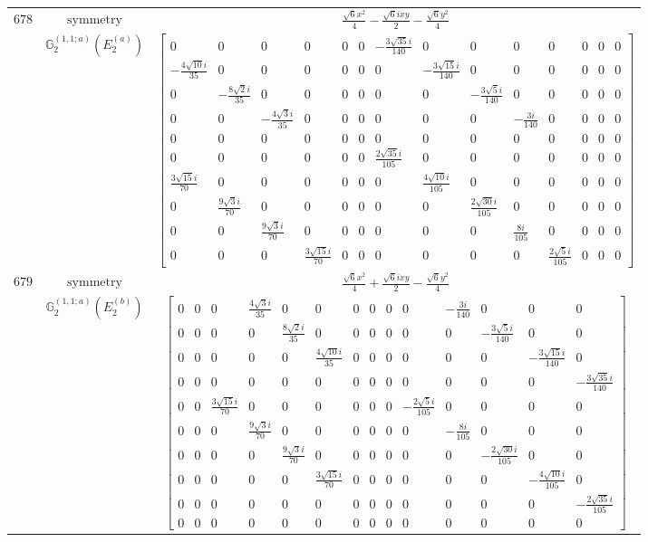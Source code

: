 \documentclass[fleqn,8pt,landscape]{jsarticle}
\begin{document}
\begin{longtable}{ccc}
$ 678 $ & $ \text{symmetry} $ & $ \frac{\sqrt{6} x^{2}}{4} - \frac{\sqrt{6} i x y}{2} - \frac{\sqrt{6} y^{2}}{4} $ \\
$  $ & $ \mathbb{G}_{2}^{(1,1;a)}(E_{2}^{(a)}) $ & $ \begin{bmatrix} 0 & 0 & 0 & 0 & 0 & 0 & - \frac{3 \sqrt{35} i}{140} & 0 & 0 & 0 & 0 & 0 & 0 & 0 \\ - \frac{4 \sqrt{10} i}{35} & 0 & 0 & 0 & 0 & 0 & 0 & - \frac{3 \sqrt{15} i}{140} & 0 & 0 & 0 & 0 & 0 & 0 \\ 0 & - \frac{8 \sqrt{2} i}{35} & 0 & 0 & 0 & 0 & 0 & 0 & - \frac{3 \sqrt{5} i}{140} & 0 & 0 & 0 & 0 & 0 \\ 0 & 0 & - \frac{4 \sqrt{3} i}{35} & 0 & 0 & 0 & 0 & 0 & 0 & - \frac{3 i}{140} & 0 & 0 & 0 & 0 \\ 0 & 0 & 0 & 0 & 0 & 0 & 0 & 0 & 0 & 0 & 0 & 0 & 0 & 0 \\ 0 & 0 & 0 & 0 & 0 & 0 & \frac{2 \sqrt{35} i}{105} & 0 & 0 & 0 & 0 & 0 & 0 & 0 \\ \frac{3 \sqrt{15} i}{70} & 0 & 0 & 0 & 0 & 0 & 0 & \frac{4 \sqrt{10} i}{105} & 0 & 0 & 0 & 0 & 0 & 0 \\ 0 & \frac{9 \sqrt{3} i}{70} & 0 & 0 & 0 & 0 & 0 & 0 & \frac{2 \sqrt{30} i}{105} & 0 & 0 & 0 & 0 & 0 \\ 0 & 0 & \frac{9 \sqrt{3} i}{70} & 0 & 0 & 0 & 0 & 0 & 0 & \frac{8 i}{105} & 0 & 0 & 0 & 0 \\ 0 & 0 & 0 & \frac{3 \sqrt{15} i}{70} & 0 & 0 & 0 & 0 & 0 & 0 & \frac{2 \sqrt{5} i}{105} & 0 & 0 & 0 \end{bmatrix} $ \\ \hline
$ 679 $ & $ \text{symmetry} $ & $ \frac{\sqrt{6} x^{2}}{4} + \frac{\sqrt{6} i x y}{2} - \frac{\sqrt{6} y^{2}}{4} $ \\
$  $ & $ \mathbb{G}_{2}^{(1,1;a)}(E_{2}^{(b)}) $ & $ \begin{bmatrix} 0 & 0 & 0 & \frac{4 \sqrt{3} i}{35} & 0 & 0 & 0 & 0 & 0 & 0 & - \frac{3 i}{140} & 0 & 0 & 0 \\ 0 & 0 & 0 & 0 & \frac{8 \sqrt{2} i}{35} & 0 & 0 & 0 & 0 & 0 & 0 & - \frac{3 \sqrt{5} i}{140} & 0 & 0 \\ 0 & 0 & 0 & 0 & 0 & \frac{4 \sqrt{10} i}{35} & 0 & 0 & 0 & 0 & 0 & 0 & - \frac{3 \sqrt{15} i}{140} & 0 \\ 0 & 0 & 0 & 0 & 0 & 0 & 0 & 0 & 0 & 0 & 0 & 0 & 0 & - \frac{3 \sqrt{35} i}{140} \\ 0 & 0 & \frac{3 \sqrt{15} i}{70} & 0 & 0 & 0 & 0 & 0 & 0 & - \frac{2 \sqrt{5} i}{105} & 0 & 0 & 0 & 0 \\ 0 & 0 & 0 & \frac{9 \sqrt{3} i}{70} & 0 & 0 & 0 & 0 & 0 & 0 & - \frac{8 i}{105} & 0 & 0 & 0 \\ 0 & 0 & 0 & 0 & \frac{9 \sqrt{3} i}{70} & 0 & 0 & 0 & 0 & 0 & 0 & - \frac{2 \sqrt{30} i}{105} & 0 & 0 \\ 0 & 0 & 0 & 0 & 0 & \frac{3 \sqrt{15} i}{70} & 0 & 0 & 0 & 0 & 0 & 0 & - \frac{4 \sqrt{10} i}{105} & 0 \\ 0 & 0 & 0 & 0 & 0 & 0 & 0 & 0 & 0 & 0 & 0 & 0 & 0 & - \frac{2 \sqrt{35} i}{105} \\ 0 & 0 & 0 & 0 & 0 & 0 & 0 & 0 & 0 & 0 & 0 & 0 & 0 & 0 \end{bmatrix} $ \\ \hline

\end{longtable}
\end{document}
